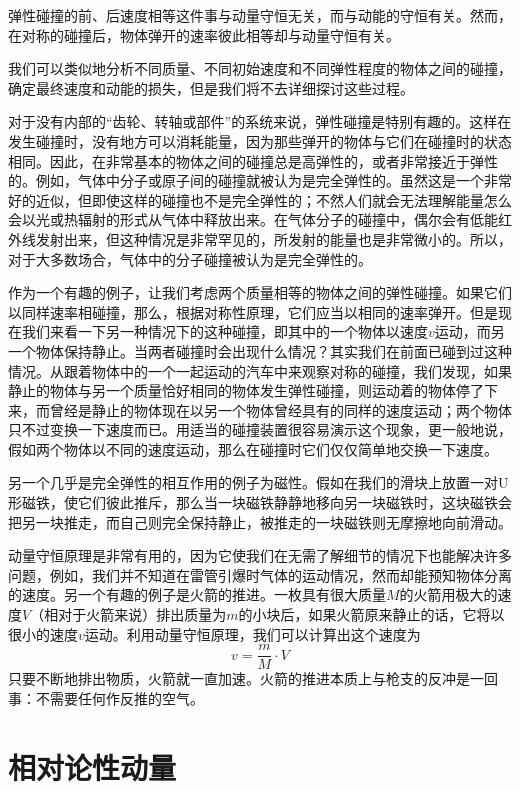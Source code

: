弹性碰撞的前、后速度相等这件事与动量守恒无关，而与动能的守恒有关。然而，在对称的碰撞后，物体弹开的速率彼此相等却与动量守恒有关。

我们可以类似地分析不同质量、不同初始速度和不同弹性程度的物体之间的碰撞，确定最终速度和动能的损失，但是我们将不去详细探讨这些过程。

对于没有内部的“齿轮、转轴或部件”的系统来说，弹性碰撞是特别有趣的。这样在发生碰撞时，没有地方可以消耗能量，因为那些弹开的物体与它们在碰撞时的状态相同。因此，在非常基本的物体之间的碰撞总是高弹性的，或者非常接近于弹性的。例如，气体中分子或原子间的碰撞就被认为是完全弹性的。虽然这是一个非常好的近似，但即使这样的碰撞也不是完全弹性的；不然人们就会无法理解能量怎么会以光或热辐射的形式从气体中释放出来。在气体分子的碰撞中，偶尔会有低能红外线发射出来，但这种情况是非常罕见的，所发射的能量也是非常微小的。所以，对于大多数场合，气体中的分子碰撞被认为是完全弹性的。

作为一个有趣的例子，让我们考虑两个质量相等的物体之间的弹性碰撞。如果它们以同样速率相碰撞，那么，根据对称性原理，它们应当以相同的速率弹开。但是现在我们来看一下另一种情况下的这种碰撞，即其中的一个物体以速度$v$运动，而另一个物体保持静止。当两者碰撞时会出现什么情况？其实我们在前面已碰到过这种情况。从跟着物体中的一个一起运动的汽车中来观察对称的碰撞，我们发现，如果静止的物体与另一个质量恰好相同的物体发生弹性碰撞，则运动着的物体停了下来，而曾经是静止的物体现在以另一个物体曾经具有的同样的速度运动；两个物体只不过变换一下速度而已。用适当的碰撞装置很容易演示这个现象，更一般地说，假如两个物体以不同的速度运动，那么在碰撞时它们仅仅简单地交换一下速度。

另一个几乎是完全弹性的相互作用的例子为磁性。假如在我们的滑块上放置一对U形磁铁，使它们彼此推斥，那么当一块磁铁静静地移向另一块磁铁时，这块磁铁会把另一块推走，而自己则完全保持静止，被推走的一块磁铁则无摩擦地向前滑动。

动量守恒原理是非常有用的，因为它使我们在无需了解细节的情况下也能解决许多问题，例如，我们并不知道在雷管引爆时气体的运动情况，然而却能预知物体分离的速度。另一个有趣的例子是火箭的推进。一枚具有很大质量$M$的火箭用极大的速度$V$（相对于火箭来说）排出质量为$m$的小块后，如果火箭原来静止的话，它将以很小的速度$v$运动。利用动量守恒原理，我们可以计算出这个速度为
\begin{equation*}
    v=\frac{m}{M} \cdot V
\end{equation*}
只要不断地排出物质，火箭就一直加速。火箭的推进本质上与枪支的反冲是一回事：不需要任何作反推的空气。

\section{相对论性动量}

